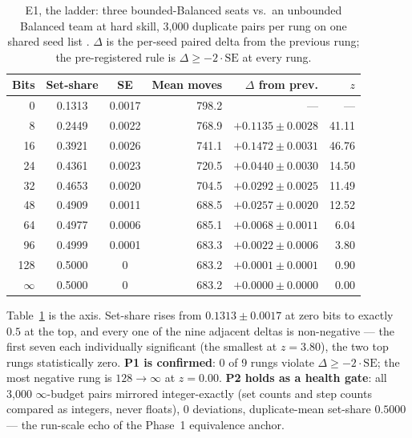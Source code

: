 \documentclass[11pt]{article}
\begin{document}
\begin{table}[t]
\centering
\caption{E1, the ladder: three bounded-Balanced seats vs.\ an unbounded Balanced team
at hard skill, 3{,}000 duplicate pairs per rung on one shared seed list
\cite{artifact}. $\Delta$ is the per-seed paired delta from the previous rung; the
pre-registered rule is $\Delta \ge -2 \cdot \text{SE}$ at every rung.}
\label{tab:ladder}
\footnotesize
\begin{tabular}{@{}rccrrr@{}}
\toprule
Bits & Set-share & SE & Mean moves & $\Delta$ from prev. & $z$ \\
\midrule
0        & 0.1313 & 0.0017 & 798.2 & ---                  & --- \\
8        & 0.2449 & 0.0022 & 768.9 & $+0.1135 \pm 0.0028$ & 41.11 \\
16       & 0.3921 & 0.0026 & 741.1 & $+0.1472 \pm 0.0031$ & 46.76 \\
24       & 0.4361 & 0.0023 & 720.5 & $+0.0440 \pm 0.0030$ & 14.50 \\
32       & 0.4653 & 0.0020 & 704.5 & $+0.0292 \pm 0.0025$ & 11.49 \\
48       & 0.4909 & 0.0011 & 688.5 & $+0.0257 \pm 0.0020$ & 12.52 \\
64       & 0.4977 & 0.0006 & 685.1 & $+0.0068 \pm 0.0011$ & 6.04 \\
96       & 0.4999 & 0.0001 & 683.3 & $+0.0022 \pm 0.0006$ & 3.80 \\
128      & 0.5000 & 0      & 683.2 & $+0.0001 \pm 0.0001$ & 0.90 \\
$\infty$ & 0.5000 & 0      & 683.2 & $+0.0000 \pm 0.0000$ & 0.00 \\
\bottomrule
\end{tabular}
\end{table}

Table~\ref{tab:ladder} is the axis. Set-share rises from $0.1313 \pm 0.0017$ at zero
bits to exactly $0.5$ at the top, and every one of the nine adjacent deltas is
non-negative --- the first seven each individually significant (the smallest at
$z = 3.80$), the two top rungs statistically zero. \textbf{P1 is confirmed}: 0 of 9 rungs violate
$\Delta \ge -2\cdot\text{SE}$; the most negative rung is $128 {\to} \infty$ at
$z = 0.00$. \textbf{P2 holds as a health gate}: all 3{,}000 $\infty$-budget pairs
mirrored integer-exactly (set counts and step counts compared as integers, never
floats), 0 deviations, duplicate-mean set-share $0.5000$ --- the run-scale echo of the
Phase~1 equivalence anchor.
\end{document}
